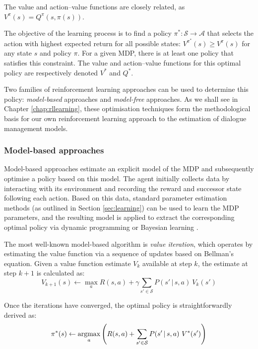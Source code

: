The value and action--value functions are closely related, as $V^{\pi}(s) = Q^{\pi}(s,\pi(s))$.

The objective of the learning process is to find a policy $\pi^*: \mathcal{S} \rightarrow \mathcal{A}$ that selects the action with highest expected return for all possible states: $V^{\pi^*}(s) \geq V^{\pi}(s)$ for any state $s$ and policy $\pi$.  For a given MDP, there is at least one policy that satisfies this constraint. The value and action--value functions for this optimal policy are respectively denoted $V^*$ and $Q^*$. 

Two families of reinforcement learning approaches can be used to determine this policy: \textit{model-based} approaches and \textit{model-free} approaches. As we shall see in Chapter \ref{chap:rllearning}, these optimisation techniques form the methodological basis for our own reinforcement learning approach to the estimation of dialogue management models. 

\subsubsection*{Model-based approaches}

Model-based approaches estimate an explicit model of the MDP and subsequently optimise a policy based on this model. The agent initially collects data by interacting with its environment and recording the reward and successor state following each action. Based on this data, standard parameter estimation methods (as outlined in Section \ref{sec:learning}) can be used to learn the MDP parameters, and the resulting model is  applied to extract the corresponding optimal policy via dynamic programming \citep{Bertsekas:1996} or Bayesian learning \citep{DeardenFA99}.  

The most well-known model-based algorithm is \textit{value iteration}, which operates by estimating the value function via a sequence of updates based on Bellman's equation. Given a value function estimate $V_k$ available at step $k$, the estimate at step $k+1$ is calculated as: 
\begin{equation}
V_{k+1}(s) \leftarrow \max_a R(s,a) + \gamma \sum_{s' \in \mathcal{S}} P(s' \, | \, s, a) \ V_k(s')
\end{equation}

Once the iterations have converged, the optimal policy is straightforwardly derived as:
\begin{equation}
\pi^*(s) \leftarrow \argmax_a \left(R(s,a) + \sum_{s' \in \mathcal{S}} P(s' \, | \, s, a) \ V^*(s')\right)
\end{equation}


